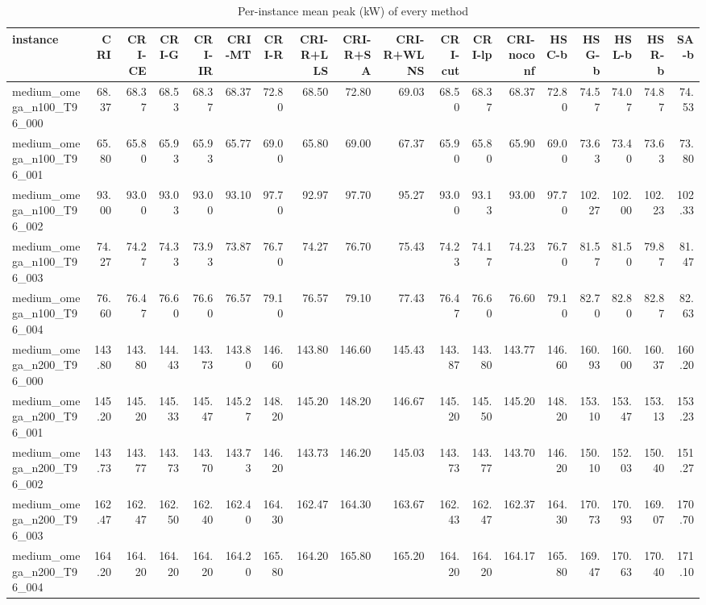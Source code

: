 \begin{table}[htbp]
\centering
\small
\caption{Per-instance mean peak (kW) of every method}
\label{tab:E5_ablation_b10_per_instance}
\begin{tabular}{lrrrrrrrrrrrrrrrrr}
\toprule
instance & CRI & CRI-CE & CRI-G & CRI-IR & CRI-MT & CRI-R & CRI-R+LLS & CRI-R+SA & CRI-R+WLNS & CRI-cut & CRI-lp & CRI-noconf & HSC-b & HSG-b & HSL-b & HSR-b & SA-b \\
\midrule
medium\_omega\_n100\_T96\_000 & 68.37 & 68.37 & 68.53 & 68.37 & 68.37 & 72.80 & 68.50 & 72.80 & 69.03 & 68.50 & 68.37 & 68.37 & 72.80 & 74.57 & 74.07 & 74.87 & 74.53 \\
medium\_omega\_n100\_T96\_001 & 65.80 & 65.80 & 65.93 & 65.93 & 65.77 & 69.00 & 65.80 & 69.00 & 67.37 & 65.90 & 65.80 & 65.90 & 69.00 & 73.63 & 73.40 & 73.63 & 73.80 \\
medium\_omega\_n100\_T96\_002 & 93.00 & 93.00 & 93.03 & 93.00 & 93.10 & 97.70 & 92.97 & 97.70 & 95.27 & 93.00 & 93.13 & 93.00 & 97.70 & 102.27 & 102.00 & 102.23 & 102.33 \\
medium\_omega\_n100\_T96\_003 & 74.27 & 74.27 & 74.33 & 73.93 & 73.87 & 76.70 & 74.27 & 76.70 & 75.43 & 74.23 & 74.17 & 74.23 & 76.70 & 81.57 & 81.50 & 79.87 & 81.47 \\
medium\_omega\_n100\_T96\_004 & 76.60 & 76.47 & 76.60 & 76.60 & 76.57 & 79.10 & 76.57 & 79.10 & 77.43 & 76.47 & 76.60 & 76.60 & 79.10 & 82.70 & 82.80 & 82.87 & 82.63 \\
medium\_omega\_n200\_T96\_000 & 143.80 & 143.80 & 144.43 & 143.73 & 143.80 & 146.60 & 143.80 & 146.60 & 145.43 & 143.87 & 143.80 & 143.77 & 146.60 & 160.93 & 160.00 & 160.37 & 160.20 \\
medium\_omega\_n200\_T96\_001 & 145.20 & 145.20 & 145.33 & 145.47 & 145.27 & 148.20 & 145.20 & 148.20 & 146.67 & 145.20 & 145.50 & 145.20 & 148.20 & 153.10 & 153.47 & 153.13 & 153.23 \\
medium\_omega\_n200\_T96\_002 & 143.73 & 143.77 & 143.73 & 143.70 & 143.73 & 146.20 & 143.73 & 146.20 & 145.03 & 143.73 & 143.77 & 143.70 & 146.20 & 150.10 & 152.03 & 150.40 & 151.27 \\
medium\_omega\_n200\_T96\_003 & 162.47 & 162.47 & 162.50 & 162.40 & 162.40 & 164.30 & 162.47 & 164.30 & 163.67 & 162.43 & 162.47 & 162.37 & 164.30 & 170.73 & 170.93 & 169.07 & 170.70 \\
medium\_omega\_n200\_T96\_004 & 164.20 & 164.20 & 164.20 & 164.20 & 164.20 & 165.80 & 164.20 & 165.80 & 165.20 & 164.20 & 164.20 & 164.17 & 165.80 & 169.47 & 170.63 & 170.40 & 171.10 \\

\end{tabular}
\end{table}
